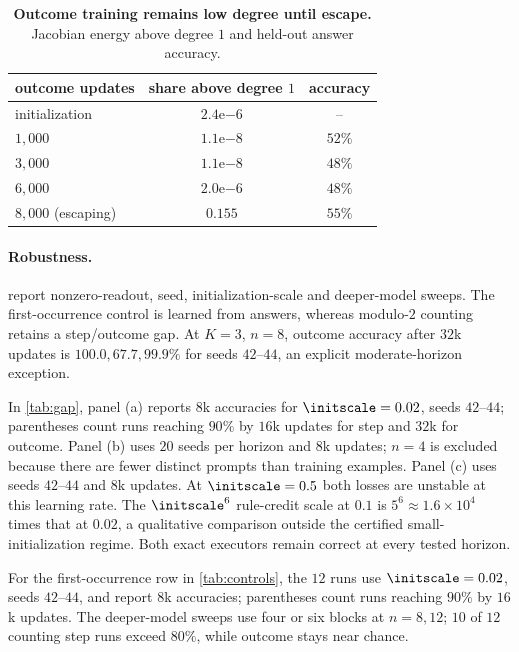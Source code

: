 \begin{table}[H]
\centering\small
\begin{tabular}{@{}lcc@{}}
\toprule
outcome updates & share above degree $1$ & accuracy\\
\midrule
initialization & $2.4\mathrm{e}{-6}$ & --\\
$1{,}000$ & $1.1\mathrm{e}{-8}$ & $52\%$\\
$3{,}000$ & $1.1\mathrm{e}{-8}$ & $48\%$\\
$6{,}000$ & $2.0\mathrm{e}{-6}$ & $48\%$\\
$8{,}000$ (escaping) & $0.155$ & $55\%$\\
\bottomrule
\end{tabular}
\caption{\textbf{Outcome training remains low degree until escape.} Jacobian energy above degree $1$ and held-out answer accuracy.}
\label{tab:main-evidence}
\end{table}

\paragraph{Robustness.}  report nonzero-readout, seed, initialization-scale and deeper-model sweeps.
The first-occurrence control is learned from answers, whereas modulo-$2$ counting retains a step/outcome gap.
At $K=3$, $n=8$, outcome accuracy after $32$k updates is $100.0,67.7,99.9\%$ for seeds $42$--$44$,
an explicit moderate-horizon exception.

In \cref{tab:gap}, panel (a) reports $8$k accuracies for $\initscale=0.02$, seeds $42$--$44$; parentheses count runs reaching
$90\%$ by $16$k updates for step and $32$k for outcome. Panel (b) uses $20$ seeds per horizon and $8$k updates;
$n=4$ is excluded because there are fewer distinct prompts than training examples. Panel (c) uses seeds $42$--$44$ and $8$k updates.
At $\initscale=0.5$ both losses are unstable at this learning rate. The $\initscale^6$ rule-credit scale at $0.1$ is
$5^6\approx1.6\times10^4$ times that at $0.02$, a qualitative comparison outside the certified small-initialization regime.
Both exact executors remain correct at every tested horizon.

For the first-occurrence row in \cref{tab:controls}, the $12$ runs use $\initscale=0.02$, seeds $42$--$44$, and report $8$k accuracies;
parentheses count runs reaching $90\%$ by $16$k updates. The deeper-model sweeps use four or six blocks at $n=8,12$;
$10$ of $12$ counting step runs exceed $80\%$, while outcome stays near chance.

